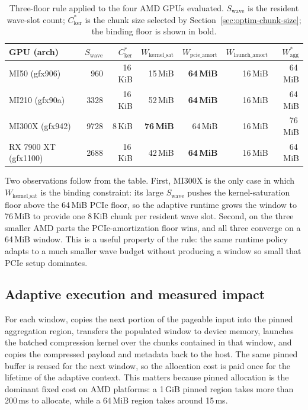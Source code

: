 \begin{table}[t]
\centering
\caption{Three-floor rule applied to the four AMD GPUs evaluated.
$S_{\text{wave}}$ is the resident wave-slot count;
$C_{\text{ker}}^{*}$ is the chunk size selected by
Section~\ref{sec:optim-chunk-size}; the binding floor is shown in
bold.}
\label{tab:three-floors}
\small
\begin{tabular}{lrrrrrr}
\toprule
GPU (arch) & $S_{\text{wave}}$ & $C_{\text{ker}}^{*}$
  & $W_{\text{kernel\_sat}}$ & $W_{\text{pcie\_amort}}$
  & $W_{\text{launch\_amort}}$ & $W_{\text{agg}}^{*}$ \\
\midrule
MI50 (gfx906)     &  960 & 16\,KiB & 15\,MiB &
                    \textbf{64\,MiB} & 16\,MiB & 64\,MiB \\
MI210 (gfx90a)    & 3328 & 16\,KiB & 52\,MiB &
                    \textbf{64\,MiB} & 16\,MiB & 64\,MiB \\
MI300X (gfx942)   & 9728 &  8\,KiB & \textbf{76\,MiB} &
                    64\,MiB & 16\,MiB & 76\,MiB \\
RX 7900 XT (gfx1100) & 2688 & 16\,KiB & 42\,MiB &
                    \textbf{64\,MiB} & 16\,MiB & 64\,MiB \\
\bottomrule
\end{tabular}
\end{table}

Two observations follow from the table. First, MI300X is the only
case in which $W_{\text{kernel\_sat}}$ is the binding constraint: its
large $S_{\text{wave}}$ pushes the kernel-saturation floor above the
64\,MiB PCIe floor, so the adaptive runtime grows the window to
76\,MiB to provide one 8\,KiB chunk per resident wave slot. Second,
on the three smaller AMD parts the PCIe-amortization floor wins, and
all three converge on a 64\,MiB window. This is a useful property of
the rule: the same runtime policy adapts to a much smaller wave
budget without producing a window so small that PCIe setup
dominates.

\subsection{Adaptive execution and measured impact}
\label{sec:adaptive-execution}

For each window, \arcto{} copies the next portion of the pageable
input into the pinned aggregation region, transfers the populated
window to device memory, launches the batched compression kernel over
the chunks contained in that window, and copies the compressed
payload and metadata back to the host. The same pinned buffer is
reused for the next window, so the allocation cost is paid once for
the lifetime of the adaptive context. This matters because pinned
allocation is the dominant fixed cost on AMD platforms: a 1\,GiB
pinned region takes more than 200\,ms to allocate, while a 64\,MiB
region takes around 15\,ms.

